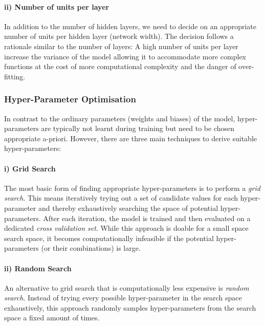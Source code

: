 %
%
%

\paragraph{ii) Number of units per layer} In addition to the number of hidden layers, we need to decide on an appropriate number of units per hidden layer (network width). The decision follows a rationale similar to the number of layers: A high number of units per layer increase the variance of the model allowing it to accommodate more complex functions at the cost of more computational complexity and the danger of over-fitting.  


\subsubsection{Hyper-Parameter Optimisation}
In contrast to the ordinary parameters (weights and biases) of the model, hyper-parameters are typically not learnt during training but need to be chosen appropriate a-priori. However, there are three main techniques to derive suitable hyper-parameters:

\paragraph{i) Grid Search} The most basic form of finding appropriate hyper-parameters is to perform a \emph{grid search}. This means iteratively trying out a set of candidate values for each hyper-parameter and thereby exhaustively searching the space of potential hyper-parameters. After each iteration, the model is trained and then evaluated on a dedicated \emph{cross validation set}. %
While this approach is doable for a small space search space, it becomes computationally infeasible if the potential hyper-parameters (or their combinations) is large. 

\paragraph{ii) Random Search} An alternative to grid search that is computationally less expensive is \emph{random search}. Instead of trying every possible hyper-parameter in the search space exhaustively, this approach randomly samples hyper-parameters from the search space a fixed amount of times. 

